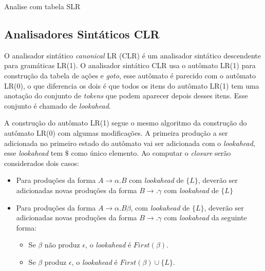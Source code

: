 \begin{algorithm}[htp]
    \caption{Analise com tabela SLR}\label{alg:slrparsing}
\end{algorithm}
\FloatBarrier

\subsection{Analisadores Sintáticos CLR}
O analisador sintático \textit{canonical} LR (CLR) é um analisador sintático descendente para gramáticas LR(1). O analisador sintático CLR usa o autômato LR(1) para construção da tabela de ações e \textit{goto}, esse autômato é parecido com o autômato LR(0), o que diferencia os dois é que todos os itens do autômato LR(1) tem uma anotação do conjunto de \textit{tokens} que podem aparecer depois desses itens. Esse conjunto é chamado de \textit{lookahead}. 

A construção do autômato LR(1) segue o mesmo algoritmo da construção do autômato LR(0) com algumas modificações. A primeira produção a ser adicionada no primeiro estado do autômato vai ser adicionada com o \textit{lookahead}, esse \textit{lookahead} tem $\$$ como único elemento. Ao computar o \textit{closure} serão considerados dois casos:
\begin{itemize}[label=$\sbullet$]
    \item Para produções da forma $A \rightarrow \alpha . B $ com \textit{lookahead} de $\{L\}$, deverão ser adicionadas novas produções da forma $B \rightarrow . \gamma$ com \textit{lookahead} de $\{L\}$
    \item Para produções da forma $A \rightarrow \alpha.B\beta$, com \textit{lookahead} de $\{L\}$, deverão ser adicionadas novas produções da forma $B \rightarrow . \gamma$ com \textit{lookahead} da seguinte forma:
    \begin{itemize}
        \item Se $\beta$ não produz $\epsilon$, o \textit{lookahead} é $First(\beta)$.
        \item Se $\beta$ produz $\epsilon$, o \textit{lookahead} é $First(\beta)\cup\{L\}$.
    \end{itemize}
\end{itemize}

